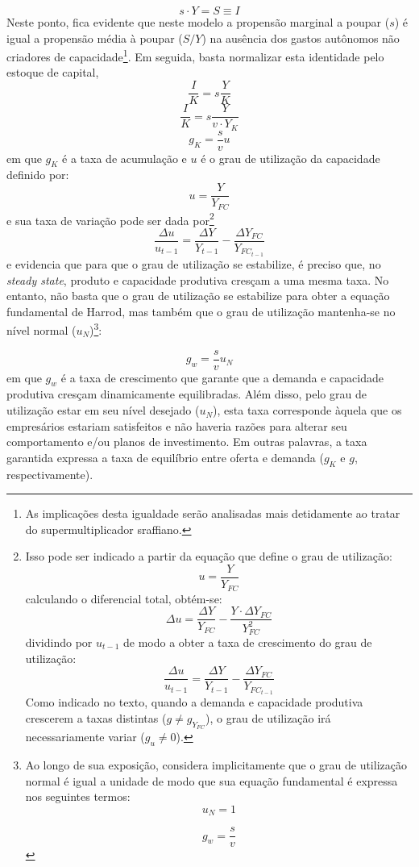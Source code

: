 $$
s\cdot Y = S \equiv I
$$
Neste ponto, fica evidente que neste modelo a propensão marginal a poupar ($s$) é igual a propensão média à poupar ($S/Y$) na ausência dos gastos autônomos não criadores de capacidade\footnote{As implicações desta igualdade serão analisadas mais detidamente ao tratar do supermultiplicador sraffiano.}. Em seguida, basta normalizar esta identidade pelo estoque de capital,
$$
\frac{I}{K} = s\frac{Y}{K}
$$
$$
\frac{I}{K} = s\frac{Y}{v\cdot Y_K}
$$
\begin{equation}
\label{tx_gk}
    g_K = \frac{s}{v}u
\end{equation}
em que $g_K$ é a taxa de acumulação e $u$ é o grau de utilização da capacidade definido por:
$$
u = \frac{Y}{Y_{FC}}
$$
e sua taxa de variação pode ser dada por\footnote{Isso pode ser indicado a partir da equação que define o grau de utilização:
	$$
	u = \frac{Y}{Y_{FC}}
	$$
	calculando o diferencial total, obtém-se:
	$$
	\Delta u = \frac{\Delta Y}{ Y_{FC}} - \frac{Y\cdot \Delta Y_{FC}}{Y_{FC}^2}
	$$
	dividindo por $u_{t-1}$ de modo a obter a taxa de crescimento do grau de utilização:
	$$
	\frac{\Delta u}{u_{t-1}} = \frac{\Delta Y}{Y_{t-1}} - \frac{\Delta Y_{FC}}{Y_{FC_{t-1}}}
	$$
	Como indicado no texto, quando a demanda e capacidade produtiva crescerem a taxas distintas ($g \neq g_{Y_{FC}}$), o grau de utilização irá necessariamente variar ($g_u \neq 0$).
}
$$
\frac{\Delta u}{u_{t-1}} = \frac{\Delta Y}{Y_{t-1}} - \frac{\Delta Y_{FC}}{Y_{FC_{t-1}}}
$$
e evidencia que para que o grau de utilização se estabilize, é preciso que, no \textit{steady state}, produto e capacidade produtiva cresçam a uma mesma taxa. 
No entanto, não basta que o grau de utilização se estabilize para obter a equação fundamental de Harrod, mas também que o grau de utilização mantenha-se no nível normal ($u_N$)\footnote{
	Ao longo de sua exposição, \textcite{harrod_essay_1939} considera implicitamente que o grau de utilização normal é igual a unidade de modo que sua equação fundamental é expressa nos seguintes termos:
	$$
	u_N = 1
	$$
	
	$$
	g_w = \frac{s}{v}
	$$
}:

\begin{equation}
    \label{Fundamental}
    g_w = \frac{s}{v}u_N
\end{equation}
em que $g_w$ é a taxa de crescimento que garante que a demanda e capacidade produtiva cresçam dinamicamente equilibradas. Além disso, pelo grau de utilização estar em seu nível desejado ($u_N$), esta taxa corresponde àquela que os empresários estariam satisfeitos e não haveria razões para alterar seu comportamento e/ou planos de investimento. Em outras palavras, a taxa garantida expressa a taxa de equilíbrio entre oferta e demanda ($g_K$ e $g$, respectivamente). 


